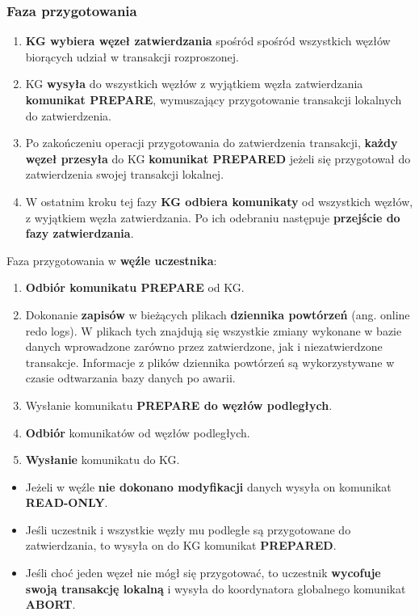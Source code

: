 \documentclass[a4paper]{article}
\begin{document}
    \subsubsection{Faza przygotowania}
    \begin{enumerate}
        \item \textbf{KG wybiera węzeł zatwierdzania} spośród spośród
        wszystkich węzłów biorących udział w transakcji rozproszonej.
        \item KG \textbf{wysyła} do wszystkich węzłów z wyjątkiem węzła zatwierdzania
        \textbf{komunikat PREPARE}, wymuszający przygotowanie transakcji lokalnych do zatwierdzenia.
        \item Po zakończeniu operacji przygotowania do zatwierdzenia transakcji, \textbf{każdy
        węzeł przesyła} do KG \textbf{komunikat PREPARED} jeżeli się
        przygotował do zatwierdzenia swojej transakcji lokalnej.
        \item W ostatnim kroku tej fazy \textbf{KG odbiera komunikaty} od
        wszystkich węzłów, z wyjątkiem węzła zatwierdzania. Po ich odebraniu
        następuje \textbf{przejście do fazy zatwierdzania}.
    \end{enumerate}

    Faza przygotowania w \textbf{węźle uczestnika}:
    \begin{enumerate}
        \item \textbf{Odbiór komunikatu PREPARE} od KG.
        \item Dokonanie \textbf{zapisów} w bieżących plikach \textbf{dziennika powtórzeń} (ang. online
        redo logs). W plikach tych znajdują się wszystkie zmiany wykonane w bazie
        danych wprowadzone zarówno przez zatwierdzone, jak i niezatwierdzone transakcje. Informacje z
        plików dziennika powtórzeń są wykorzystywane w czasie odtwarzania bazy danych po awarii.
        \item Wysłanie komunikatu \textbf{PREPARE do węzłów podległych}.
        \item \textbf{Odbiór} komunikatów od węzłów podległych.
        \item \textbf{Wysłanie} komunikatu do KG.
    \end{enumerate}

    \begin{itemize}[noitemsep]
        \item Jeżeli w węźle \textbf{nie dokonano modyfikacji} danych wysyła on komunikat \textbf{READ-ONLY}.
        \item Jeśli uczestnik i wszystkie węzły mu podległe są przygotowane do
        zatwierdzania, to wysyła on do KG komunikat \textbf{PREPARED}.
        \item Jeśli choć jeden węzeł nie mógł się przygotować, to uczestnik \textbf{wycofuje swoją
        transakcję lokalną} i wysyła do koordynatora globalnego komunikat \textbf{ABORT}.
    \end{itemize}
\end{document}
